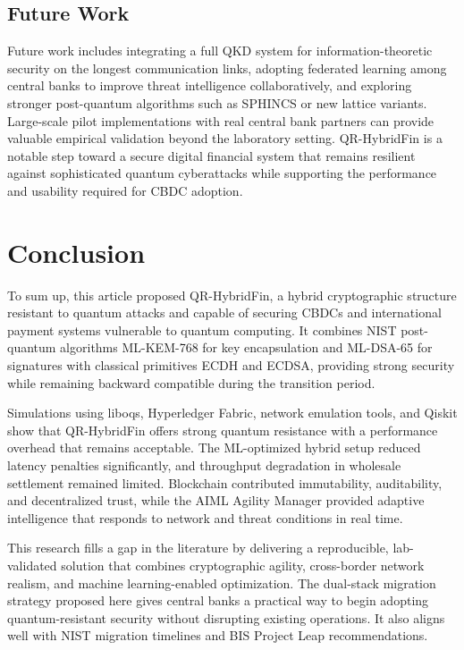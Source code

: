 \documentclass[pdflatex,sn-basic,english]{sn-jnl}
\begin{document}
\subsection{Future Work}

Future work includes integrating a full QKD system for information-theoretic security on the longest communication links, adopting federated learning among central banks to improve threat intelligence collaboratively, and exploring stronger post-quantum algorithms such as SPHINCS or new lattice variants. Large-scale pilot implementations with real central bank partners can provide valuable empirical validation beyond the laboratory setting. QR-HybridFin is a notable step toward a secure digital financial system that remains resilient against sophisticated quantum cyberattacks while supporting the performance and usability required for CBDC adoption.

\section{Conclusion}

To sum up, this article proposed QR-HybridFin, a hybrid cryptographic structure resistant to quantum attacks and capable of securing CBDCs and international payment systems vulnerable to quantum computing. It combines NIST post-quantum algorithms ML-KEM-768 for key encapsulation and ML-DSA-65 for signatures with classical primitives ECDH and ECDSA, providing strong security while remaining backward compatible during the transition period.

Simulations using liboqs, Hyperledger Fabric, network emulation tools, and Qiskit show that QR-HybridFin offers strong quantum resistance with a performance overhead that remains acceptable. The ML-optimized hybrid setup reduced latency penalties significantly, and throughput degradation in wholesale settlement remained limited. Blockchain contributed immutability, auditability, and decentralized trust, while the AIML Agility Manager provided adaptive intelligence that responds to network and threat conditions in real time.

This research fills a gap in the literature by delivering a reproducible, lab-validated solution that combines cryptographic agility, cross-border network realism, and machine learning-enabled optimization. The dual-stack migration strategy proposed here gives central banks a practical way to begin adopting quantum-resistant security without disrupting existing operations. It also aligns well with NIST migration timelines and BIS Project Leap recommendations.
\end{document}
